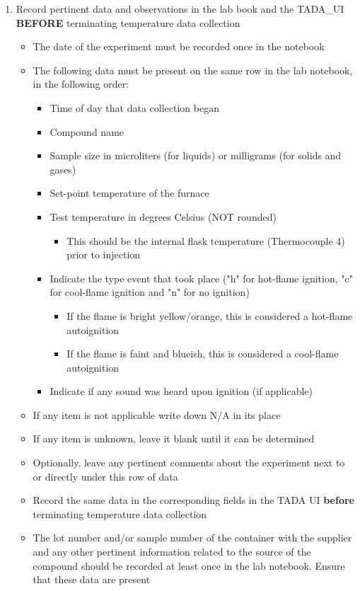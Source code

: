 \documentclass[letterpaper,11pt]{article}
\begin{document}
\begin{enumerate}
    \item Record pertinent data and observations in the lab book and 
        the TADA\_UI \textbf{BEFORE} terminating temperature data collection
        \begin{itemize}
        \item The date of the experiment must be recorded once in the notebook
        \item The following data must be present on the same row in the lab 
            notebook, in the following order:
            \begin{itemize}
            \item Time of day that data collection began
            \item Compound name 
            \item Sample size in microliters (for liquids) or milligrams
                (for solids and gases)
            \item Set-point temperature of the furnace
            \item Test temperature in degrees Celsius (NOT rounded)
                \begin{itemize}
                \item This should be the internal flask temperature 
                    (Thermocouple 4) prior to injection
                \end{itemize}
            \item Indicate the type event that took place ("h" for hot-flame 
                ignition, "c" for cool-flame ignition and "n" for no ignition)
                \begin{itemize}
                \item If the flame is bright yellow/orange, this is considered a 
                    hot-flame autoignition
                \item If the flame is faint and blueish, this is considered a 
                    cool-flame autoignition
                \end{itemize}
            \item Indicate if any sound was heard upon ignition (if applicable)
            \end{itemize}
       
        \item If any item is not applicable write down N/A in its place
        \item If any item is unknown, leave it blank until it can be determined
        \item Optionally, leave any pertinent comments about the experiment
            next to or directly under this row of data
        \item Record the same data in the corresponding fields in the TADA UI
            \textbf{before} terminating temperature data collection
        \item The lot number and/or sample number of the container with the 
            supplier and any other pertinent information related to the source
            of the compound should be recorded at least once in the lab 
            notebook. Ensure that these data are present
        \end{itemize}
        

\end{enumerate}
\end{document}

